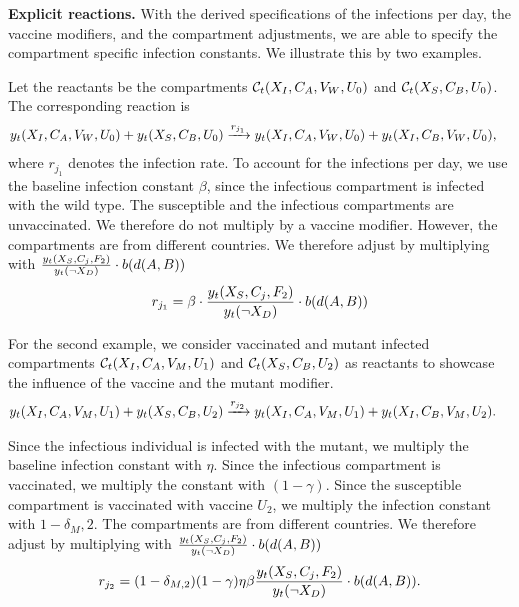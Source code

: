 \textbf{Explicit reactions.}
With the derived specifications of the infections per day, the vaccine modifiers, and the compartment adjustments, we are able to specify the compartment specific infection constants. We illustrate this by two examples. 

\begin{example}
Let the reactants be the compartments $\mathcal{C}_t(X_{I}, C_A, V_W, U_0)$ and $\mathcal{C}_t(X_{S}, C_B, U_0)$. The corresponding reaction is
\begin{align}
y_t(X_{I}, C_A, V_W, U_0) + y_t(X_{S}, C_B, U_0) &\xrightarrow{ r_{j_1}} y_t(X_{I}, C_A, V_W, U_0) + y_t(X_{I}, C_B, V_W, U_0),
\end{align}
where $r_{j_1}$ denotes the infection rate. To account for the infections per day, we use the baseline infection constant $\beta$, since the infectious compartment is infected with the wild type. The susceptible and the infectious compartments are unvaccinated. We therefore do not multiply by a vaccine modifier. However, the compartments are from different countries. We therefore adjust by multiplying with $\frac{y_t(X_S, C_j, F_2)}{y_t(\neg X_D)} \cdot b(d(A, B))$
\begin{align}
r_{j_1} = \beta \cdot \frac{y_t(X_S, C_j, F_2)}{y_t(\neg X_D)} \cdot b(d(A, B))
\end{align}
\end{example}

\begin{example}
For the second example, we consider vaccinated and mutant infected compartments $\mathcal{C}_t(X_{I}, C_A, V_M, U_1)$ and $\mathcal{C}_t(X_{S}, C_B, U_2)$ as reactants to showcase the influence of the vaccine and the mutant modifier. 
\begin{align}
y_t(X_{I}, C_A, V_M, U_1) + y_t(X_{S}, C_B, U_2) &\xrightarrow{ r_{j_2}} y_t(X_{I}, C_A, V_M, U_1) + y_t(X_{I}, C_B, V_M, U_2).
\end{align}

Since the infectious individual is infected with the mutant, we multiply the baseline infection constant with $\eta$. Since the infectious compartment is vaccinated, we multiply the constant with $(1-\gamma)$. Since the susceptible compartment is vaccinated with vaccine $U_2$, we multiply the infection constant with $1-\delta_M,2$. The compartments are from different countries. We therefore adjust by multiplying with $\frac{y_t(X_S, C_j, F_2)}{y_t(\neg X_D)} \cdot b(d(A, B))$
\begin{align}
r_{j_2} = (1-\delta_{M,2}) (1-\gamma) \eta \beta  \frac{y_t(X_S, C_j, F_2)}{y_t(\neg X_D)} \cdot b(d(A, B)).
\end{align}
\end{example}

